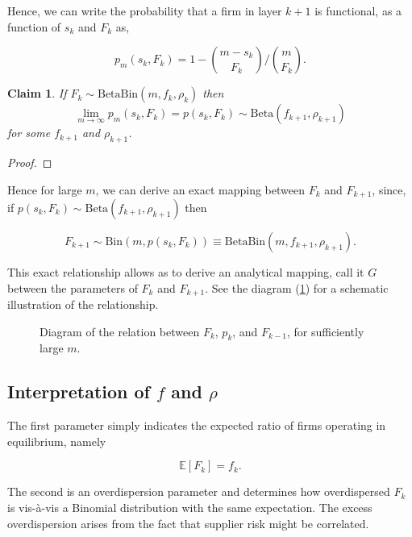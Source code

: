 \documentclass[american, abstract=on]{scrartcl}
\newcommand{\inputTikZ}[2]{%
      \scalebox{#1}{}  
    }
\theoremstyle{plain}
\newtheorem{claim}{Claim}
\newcommand{\E}{\mathbb{E}}
\newcommand{\Beta}{\text{Beta}}
\newcommand{\Bin}{\text{Bin}}
\begin{document}
Hence, we can write the probability that a firm in layer $k + 1$ is functional, as a function of $s_k$ and $F_k$ as,

\begin{equation}
  p_m(s_k, F_k) = 1 - \binom{m - s_k}{F_k} \Bigg/ \binom{m}{F_k}.
\end{equation}

\begin{claim}
  If $F_k \sim \Beta\Bin(m, f_k, \rho_k)$ then \begin{equation*}\lim_{m \rightarrow \infty} p_m(s_k, F_k) = p(s_k, F_k) \sim \Beta(f_{k + 1}, \rho_{k + 1})\end{equation*} for some $f_{k + 1}$ and $\rho_{k + 1}$.
\end{claim}

\begin{proof}
  \color{red}{TODO!}
\end{proof}

Hence for large $m$, we can derive an exact mapping between $F_k$ and $F_{k + 1}$, since, if $p(s_k, F_k) \sim \Beta(f_{k + 1}, \rho_{k + 1})$ then

\begin{equation}
  F_{k+1}\sim \Bin(m, p(s_k, F_k)) \equiv \Beta\Bin(m, f_{k + 1}, \rho_{k + 1}).
\end{equation}

This exact relationship allows as to derive an analytical mapping, call it $G$ between the parameters of $F_k$ and $F_{k + 1}$. See the diagram (\ref{fig:propagation-of-risk}) for a schematic illustration of the relationship.

\begin{figure}[H]
  \centering
  \inputTikZ{1}{../diagrams/probability-propagation.tikz} 
  \caption{Diagram of the relation between $F_k$, $p_k$, and $F_{k - 1}$, for sufficiently large $m$.}
  \label{fig:propagation-of-risk}
\end{figure}

\subsection[Interpretation of the parameters]{Interpretation of $f$ and $\rho$}

The first parameter simply indicates the expected ratio of firms operating in equilibrium, namely

\begin{equation}
  \E[F_k] = f_k. 
\end{equation}

The second is an overdispersion parameter and determines how overdispersed $F_k$ is vis-à-vis a Binomial distribution with the same expectation. The excess overdispersion arises from the fact that supplier risk might be correlated.

\newpage
\nocite{*}
\printbibliography
\end{document}
